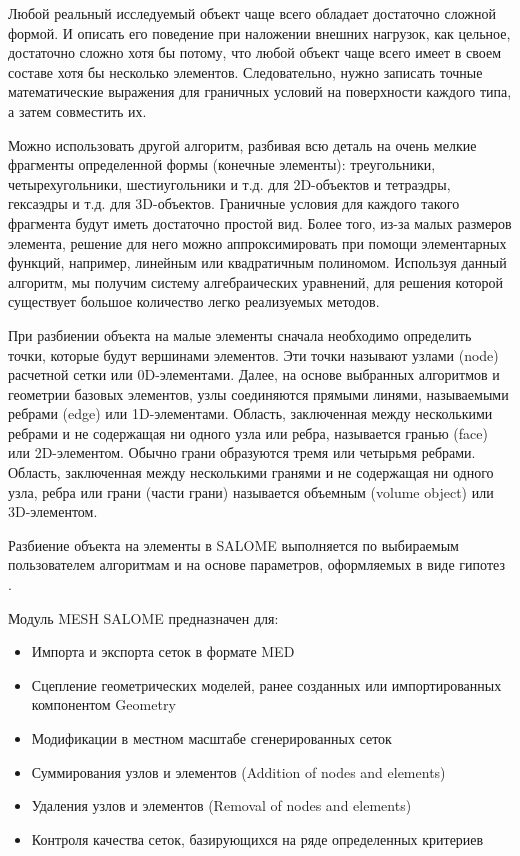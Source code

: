 \documentclass[a4paper,12pt]{article}
\theoremstyle{plain} %
\theoremstyle{definition} %
\theoremstyle{remark} %
\begin{document}
	Любой реальный исследуемый объект чаще всего обладает достаточно сложной формой. И описать его поведение при наложении внешних нагрузок, как цельное, достаточно сложно хотя бы потому, что любой объект чаще всего имеет в своем составе хотя бы несколько элементов. Следовательно, нужно записать точные математические выражения для граничных условий на поверхности каждого типа, а затем совместить их.
		
	Можно использовать другой алгоритм, разбивая всю деталь на очень мелкие фрагменты определенной формы (конечные элементы): треугольники, четырехугольники, шестиугольники и т.д. для 2D-объектов и тетраэдры, гексаэдры и т.д. для 3D-объектов. Граничные условия для каждого такого фрагмента будут иметь достаточно простой вид. Более того, из-за малых размеров элемента, решение для него можно аппроксимировать при помощи элементарных функций, например, линейным или квадратичным полиномом. Используя данный алгоритм, мы получим систему алгебраических уравнений, для решения которой существует большое количество легко реализуемых методов.
		
	При разбиении объекта на малые элементы сначала необходимо определить точки, которые будут вершинами элементов. Эти точки называют узлами (node) расчетной сетки или 0D-элементами. Далее, на основе выбранных алгоритмов и геометрии базовых элементов, узлы соединяются прямыми линями, называемыми ребрами (edge) или 1D-элементами. Область, заключенная между несколькими ребрами и не содержащая ни одного узла или ребра, называется гранью (face) или 2D-элементом. Обычно грани образуются тремя или четырьмя ребрами. Область, заключенная между несколькими гранями и не содержащая ни одного узла, ребра или грани (части грани) называется объемным (volume object) или 3D-элементом.
		
	Разбиение объекта на элементы в SALOME выполняется по выбираемым пользователем алгоритмам и на основе параметров, оформляемых в виде гипотез \cite{wIbmSALOMEMesh}.
		
	Модуль MESH SALOME предназначен для\cite{wOfDoc}:
	\begin{itemize}
		\item Импорта и экспорта сеток в формате MED
		\item Сцепление геометрических моделей, ранее созданных или импортированных компонентом Geometry
		\item Модификации в местном масштабе сгенерированных сеток
		\item Суммирования узлов и элементов (Addition of nodes and elements)
		\item Удаления узлов и элементов (Removal of nodes and elements)
		\item Контроля качества сеток, базирующихся на ряде определенных критериев
	\end{itemize}
\end{document}
